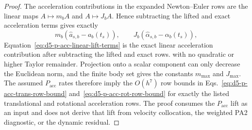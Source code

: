 \documentclass[preprint,12pt]{elsarticle}
\begin{document}
\begin{proof}
The acceleration contributions in the expanded Newton--Euler rows are the
linear maps \(A\mapsto m_b A\) and \(A\mapsto J_b A\).  Hence subtracting the
lifted and exact acceleration terms gives exactly
\begin{equation}
\label{eq:d5-p-acc-linear-lift-terms}
  m_b(\widehat a_{s,b}-a_b(t_s)),\qquad
  J_b(\widehat\alpha_{s,b}-\alpha_b(t_s)),
\end{equation}
Equation~\eqref{eq:d5-p-acc-linear-lift-terms} is the exact linear
acceleration contribution after subtracting the lifted and exact rows.
with no quadratic or higher Taylor remainder.  Projection onto a scalar
component can only decrease the Euclidean norm, and the finite body set gives
the constants \(m_{\max}\) and \(J_{\max}\).  The assumed \(P_{\mathrm{acc}}\)
rates therefore imply the \(O(h^7)\) row bounds in
Eqs.~\eqref{eq:d5-p-acc-trans-row-bound} and~\eqref{eq:d5-p-acc-rot-row-bound}
for exactly the
listed translational and rotational acceleration rows.  The proof consumes
the \(P_{\mathrm{acc}}\) lift as an input and does not derive that lift from
velocity collocation, the weighted PA2 diagnostic, or the dynamic residual.
\end{proof}
\end{document}

